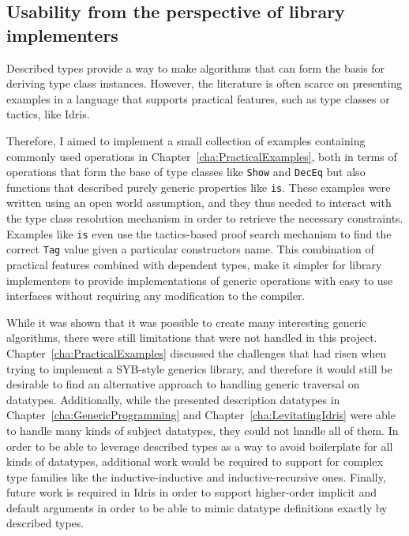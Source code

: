 \documentclass{ituthesis}
\newcommand{\tttype}[1]{\textcolor{type-color}{\texttt{#1}}}
\newcommand{\ttdec}[1]{\textcolor{declared-var-color}{\texttt{#1}}}
\theoremstyle{break}
\begin{document}
\subsection{Usability from the perspective of library implementers}
\label{sub:Usabilityfromtheperspectiveoflibraryimplementers}
Described types provide a way to make algorithms that can form the basis for deriving type class instances.
However, the literature is often scarce on presenting examples in a language that supports practical features, such as type classes or tactics, like Idris.

Therefore, I aimed to implement a small collection of examples containing commonly used operations in Chapter~\ref{cha:PracticalExamples}, both in terms of operations that form the base of type classes like \tttype{Show} and \tttype{DecEq} but also
functions that described purely generic properties like \ttdec{is}.
These examples were written using an open world assumption, and they thus needed to interact with the type class resolution mechanism in order to retrieve the necessary constraints.
Examples like \ttdec{is} even use the tactics-based proof search mechanism to find the correct \tttype{Tag} value given a particular constructors name.
This combination of practical features combined with dependent types, make it simpler for library implementers to provide implementations of generic operations with easy to use interfaces without requiring any modification to the compiler.

While it was shown that it was possible to create many interesting generic algorithms, there were still limitations that were not handled in this project.
Chapter~\ref{cha:PracticalExamples} discussed the challenges that had risen when trying to implement a SYB-style generics library, and therefore it would still be desirable to find an alternative approach to handling generic traversal on datatypes.
Additionally, while the presented description datatypes in Chapter~\ref{cha:GenericProgramming} and Chapter~\ref{cha:LevitatingIdris} were able to handle many kinds of subject datatypes, they could not handle all of them.
In order to be able to leverage described types as a way to avoid boilerplate for all kinds of datatypes, additional work would be required to support for complex type families like the inductive-inductive and inductive-recursive ones.
Finally, future work is required in Idris in order to support higher-order implicit and default arguments in order to be able to mimic datatype definitions exactly by described types.
\end{document}
